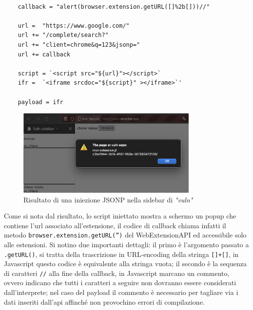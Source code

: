 \documentclass{sapthesis}
\newcommand{\code}[1]{\texttt{#1}}
\newcommand{\method}[1]{\code{.#1()}}
\newcommand{\vuln}{\textit{"vuln"}}
\newcommand{\JS}{Javascript}
\begin{document}
                \begin{lstlisting}[label=code:JSONP-vuln-crafting]
    
    callback = "alert(browser.extension.getURL([]%2b[]))//"     
    
    url =  "https://www.google.com/"
    url += "/complete/search?"
    url += "client=chrome&q=123&jsonp="
    url += callback  
    
    script = `<script src="${url}"></script>`
    ifr =  `<iframe srcdoc="${script}" ></iframe>`' 
    
    payload = ifr
                \end{lstlisting}

                \begin{figure}[ht]
                    \centering
                    \includegraphics[width=0.8\textwidth]{sidebar-jsonp-injection.png}
                    \caption{Risultato di una iniezione JSONP nella sidebar di \vuln{}}
                    \label{fig:sidebar-jsonp-injection}
                \end{figure}

                Come si nota dal risultato, lo script iniettato mostra a schermo un popup
                che contiene l'url associato all'estensione, il codice di callback chiama
                infatti il metodo \code{browser.extension.getURL('')} del WebExtensionAPI
                ed accessibile solo alle estensioni. Si notino due importanti dettagli:
                il primo è l'argomento passato a \method{getURL}, si tratta della trascrizione
                in URL-encoding della stringa \code{[]+[]}, in \JS{} questo codice è equivalente
                alla stringa vuota; il secondo è la sequenza di caratteri \code{//} alla fine della
                callback, in \JS{} marcano un commento, ovvero indicano che tutti i caratteri
                a seguire non dovranno essere considerati dall'interprete; nel caso del payload
                il commento è necessario per tagliare via i dati inseriti dall'api affinché
                non provochino errori di compilazione.\\
\end{document}
